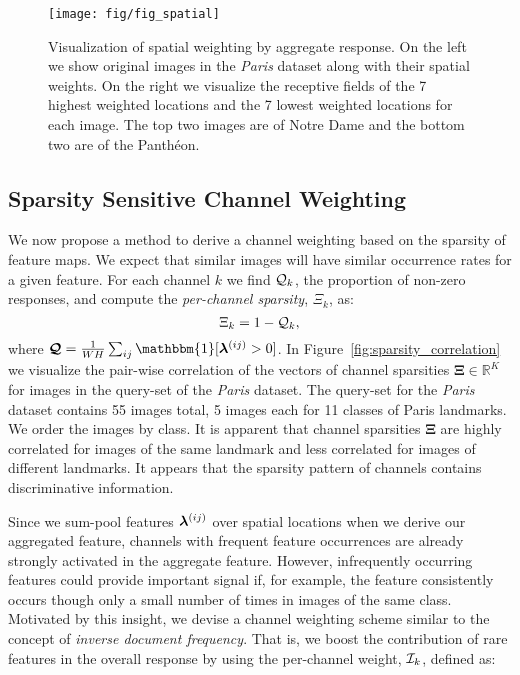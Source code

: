 \documentclass[runningheads]{llncs}
\begin{document}
\begin{figure*}[t]




\texttt{[image: fig/fig\_spatial]}
    \caption{\small{Visualization of spatial weighting by aggregate response. On the left we show original images in the \emph{Paris} dataset along with their spatial weights. On the right we visualize the receptive fields of the 7 highest weighted locations and the 7 lowest weighted locations for each image. The top two images are of Notre Dame and the bottom two are of the Panth\'{e}on.}}
	\label{fig:patches}
\end{figure*}









  


\subsection{Sparsity Sensitive Channel Weighting}
\label{subsec:idf}

We now propose a method to derive a channel weighting based on the sparsity of feature maps. We expect that similar images will have similar occurrence rates for a given feature. For each channel $k$ we find $\mathcal{Q}_{k}$, the proportion of non-zero responses, and compute the \emph{per-channel sparsity}, $\Xi_k$, as:
\begin{equation}
\Xi_k = 1 - \mathcal{Q}_{k},
\end{equation}
where  $\bm{\cQ} = \frac{1}{WH}\sum_{ij} \mathbbm{1}[\boldchannelsAtLocation > 0]$.
In Figure~\ref{fig:sparsity_correlation} we visualize the pair-wise correlation of the vectors of channel sparsities $\bm{\Xi} \in \mathbb{R}^{K}$ for images in the query-set of the \emph{Paris} dataset. The query-set for the \emph{Paris} dataset contains 55 images total, 5 images each for 11 classes of Paris landmarks. We order the images by class. It is apparent that channel sparsities $\bm{\Xi}$ are highly correlated for images of the same landmark and less correlated for images of different landmarks. It appears that the sparsity pattern of channels contains discriminative information.



Since we sum-pool features $\bm{\lambda}^{(ij)}$ over spatial locations when we derive our aggregated feature, channels with frequent feature occurrences are already strongly activated in the aggregate feature. However, infrequently occurring features could provide important signal if, for example, the feature consistently occurs though only a small number of times in images of the same class. Motivated by this insight, we devise a channel weighting scheme similar to the concept of \emph{inverse document frequency}. That is, we boost the contribution of rare features in the overall response by using the per-channel weight, $\mathcal{I}_{k}$, defined as:
\end{document}
